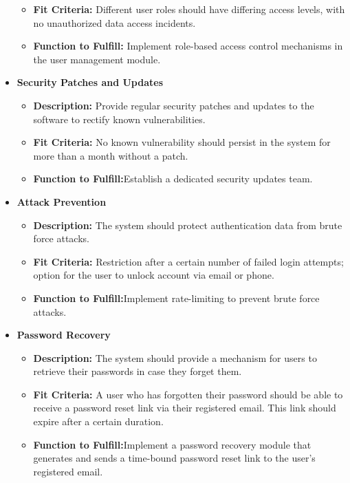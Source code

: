 \documentclass{article}
\newcounter{srnum} %
\newcommand{\rthesrnum}{SR\refstepcounter{srnum}\thesrnum:}
\begin{document}
\begin{itemize}
\begin{itemize}
  \item \textbf{Fit Criteria:} Different user roles should have differing access levels, with no unauthorized data access incidents.
  \item \textbf{Function to Fulfill:} Implement role-based access control mechanisms in the user management module.
  \end{itemize}
\item [\rthesrnum \label{Security_Patches_and_Updates}] \textbf{Security Patches and Updates}
  \begin{itemize}
  \item \textbf{Description:} Provide regular security patches and updates to the software to rectify known vulnerabilities.
  \item \textbf{Fit Criteria:} No known vulnerability should persist in the system for more than a month without a patch.
  \item \textbf{Function to Fulfill:}Establish a dedicated security updates team.
  \end{itemize}
\item [\rthesrnum \label{Attack_Prevention}] \textbf{Attack Prevention}
  \begin{itemize}
  \item \textbf{Description:} The system should protect authentication data from brute force attacks.
  \item \textbf{Fit Criteria:} Restriction after a certain number of failed login attempts; option for the user to unlock account via email or phone.
  \item \textbf{Function to Fulfill:}Implement rate-limiting to prevent brute force attacks.
  \end{itemize}
\item [\rthesrnum \label{Password_Recovery}] \textbf{Password Recovery}
  \begin{itemize}
  \item \textbf{Description:} The system should provide a mechanism for users to retrieve their passwords in case they forget them.
  \item \textbf{Fit Criteria:} A user who has forgotten their password should be able to receive a password reset link via their registered email. This link should expire after a certain duration.
  \item \textbf{Function to Fulfill:}Implement a password recovery module that generates and sends a time-bound password reset link to the user's registered email.
  \end{itemize}
\end{itemize}
\end{document}

